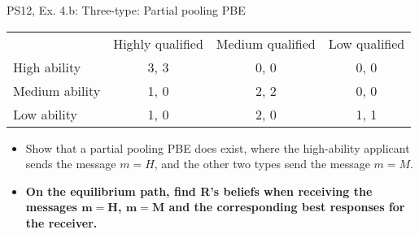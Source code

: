 \begin{frame}{PS12, Ex. 4.b: Three-type: Partial pooling PBE}
    \begin{table}
      \begin{tabular}{l|c|c|c|}
          \multicolumn{1}{c}{} & \multicolumn{1}{c}{Highly qualified} & \multicolumn{1}{c}{Medium qualified} & \multicolumn{1}{c}{Low qualified} \\\cline{2-4}
          High ability   & 3, 3 & 0, 0 & 0, 0 \\\cline{2-4}
          Medium ability & 1, 0 & 2, 2 & 0, 0 \\\cline{2-4}
          Low ability    & 1, 0 & 2, 0 & 1, 1 \\\cline{2-4}
      \end{tabular}
    \end{table}\vspace{-8pt}
    \begin{itemize}
      \item[(b)] Show that a partial pooling PBE does exist, where the high-ability applicant sends the message $m = H$, and the other two types send the message $m = M$.
      \item[Step 1:] \textbf{On the equilibrium path, find R's beliefs when receiving the messages $\bm{m=H}$, $\bm{m=M}$ and the corresponding best responses for the receiver.}
    \end{itemize}\vspace{-6pt}
    \vfill\null
\end{frame}
